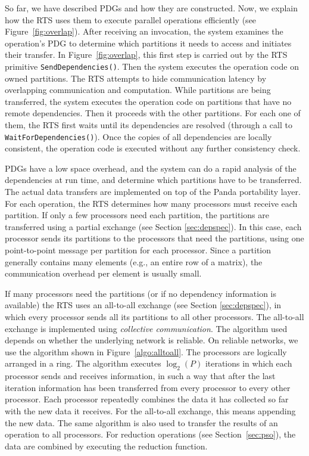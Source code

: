 \documentclass{acmtrans2e}
\begin{document}
So far, we have described PDGs and how they are constructed. Now, we
explain how the RTS uses them to execute parallel operations
efficiently (see Figure~\ref{fig:overlap}). After receiving an
invocation, the system examines the operation's PDG to determine which
partitions it needs to access and initiates their transfer. In
Figure~\ref{fig:overlap}, this first step is carried out by the RTS
primitive \verb+SendDependencies()+.  Then the system executes the
operation code on owned partitions. The RTS attempts to hide
communication latency by overlapping communication and computation.
While partitions are being transferred, the system executes the
operation code on partitions that have no remote dependencies. Then it
proceeds with the other partitions. For each one of them, the RTS
first waits until its dependencies are resolved (through a call to
\verb+WaitForDependencies()+).  Once the copies of all dependencies
are locally consistent, the operation code is executed without any
further consistency check.

PDGs have a low space overhead, and the system can do a rapid analysis
of the dependencies at run time, and determine which partitions have
to be transferred.
The actual data transfers are implemented on top of the Panda portability layer.
For each operation, the RTS determines how many processors must
receive each partition. 
If only a few processors need each partition, the partitions are transferred
using a partial exchange (see Section \ref{sec:depspec}).
In this case, each processor sends its partitions to the processors
that need the partitions, using one point-to-point message
per partition for each processor.
Since a partition generally contains many elements
(e.g., an entire row of a matrix), the communication overhead
per element is usually small.

If many processors need the partitions (or if no dependency
information is available) the RTS uses an all-to-all exchange
(see Section \ref{sec:depspec}), in which every processor
sends all its partitions to all other processors.
The all-to-all exchange is implemented using \emph{collective communication}.
The algorithm used depends on whether the underlying network is reliable.
On reliable networks, we use the algorithm shown in Figure~\ref{algo:alltoall}.
The processors are logically arranged in a ring. 
The algorithm executes $\log_2 (P)$ iterations in which each processor
sends and receives information, in such a way that after the last iteration
information has been transferred from every processor to every other processor.
Each processor repeatedly combines the data it has collected so far
with the new data it receives. For the all-to-all exchange, this means
appending the new data.
The same algorithm is also used to transfer the results of an operation
to all processors. For reduction operations (see Section~\ref{sec:pso}),
the data are combined by executing the reduction function.
\end{document}
